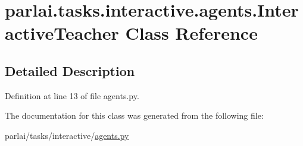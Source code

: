 \hypertarget{classparlai_1_1tasks_1_1interactive_1_1agents_1_1InteractiveTeacher}{}\section{parlai.\+tasks.\+interactive.\+agents.\+Interactive\+Teacher Class Reference}
\label{classparlai_1_1tasks_1_1interactive_1_1agents_1_1InteractiveTeacher}


\subsection{Detailed Description}


Definition at line 13 of file agents.\+py.



The documentation for this class was generated from the following file\+:\begin{DoxyCompactItemize}
\item 
parlai/tasks/interactive/\hyperlink{parlai_2tasks_2interactive_2agents_8py}{agents.\+py}\end{DoxyCompactItemize}
